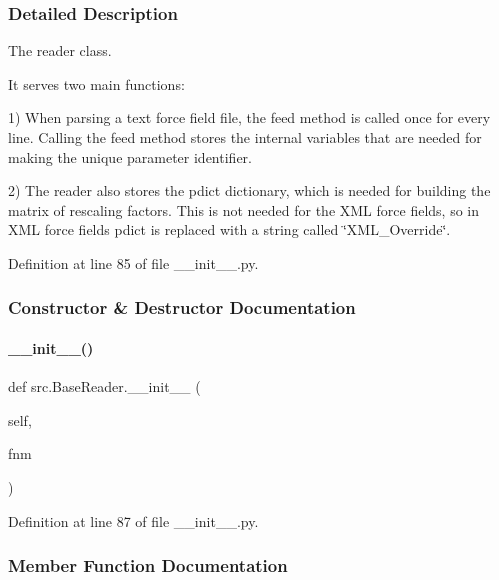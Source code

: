 \subsubsection{Detailed Description}
The \textquotesingle{}reader\textquotesingle{} class. 

It serves two main functions\+:

1) When parsing a text force field file, the \textquotesingle{}feed\textquotesingle{} method is called once for every line. Calling the \textquotesingle{}feed\textquotesingle{} method stores the internal variables that are needed for making the unique parameter identifier.

2) The \textquotesingle{}reader\textquotesingle{} also stores the \textquotesingle{}pdict\textquotesingle{} dictionary, which is needed for building the matrix of rescaling factors. This is not needed for the X\+ML force fields, so in X\+ML force fields pdict is replaced with a string called \char`\"{}\+X\+M\+L\+\_\+\+Override\char`\"{}. 

Definition at line 85 of file \+\_\+\+\_\+init\+\_\+\+\_\+.\+py.



\subsubsection{Constructor \& Destructor Documentation}
\mbox{\label{classsrc_1_1BaseReader_a71de80aae79e75dea79b6038cb781915}} 
\paragraph{\texorpdfstring{\+\_\+\+\_\+init\+\_\+\+\_\+()}{\_\_init\_\_()}}
{\footnotesize\ttfamily def src.\+Base\+Reader.\+\_\+\+\_\+init\+\_\+\+\_\+ (\begin{DoxyParamCaption}\item[{}]{self,  }\item[{}]{fnm }\end{DoxyParamCaption})}



Definition at line 87 of file \+\_\+\+\_\+init\+\_\+\+\_\+.\+py.



\subsubsection{Member Function Documentation}
\mbox{\label{classsrc_1_1BaseReader_a71385d420c4010876c06bc840d0f73db}} 
